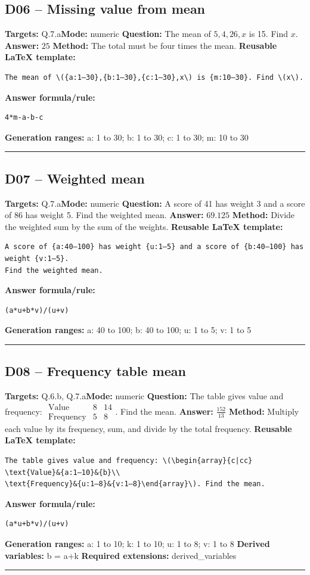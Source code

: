 \documentclass[11pt]{article}
\begin{document}
\subsection{D06 -- Missing value from mean}
\textbf{Targets:} Q.7.a\quad\textbf{Mode:} numeric
\textbf{Question:} The mean of \(5,4,26,x\) is 15. Find \(x\).
\textbf{Answer:} \(25\)
\textbf{Method:} The total must be four times the mean.
\textbf{Reusable LaTeX template:}
\begin{verbatim}
The mean of \({a:1–30},{b:1–30},{c:1–30},x\) is {m:10–30}. Find \(x\).
\end{verbatim}
\textbf{Answer formula/rule:}
\begin{verbatim}
4*m-a-b-c
\end{verbatim}
\textbf{Generation ranges:} a: 1 to 30; b: 1 to 30; c: 1 to 30; m: 10 to 30
\medskip\hrule\medskip
\subsection{D07 -- Weighted mean}
\textbf{Targets:} Q.7.a\quad\textbf{Mode:} numeric
\textbf{Question:} A score of 41 has weight 3 and a score of 86 has weight 5. Find the weighted mean.
\textbf{Answer:} \(69.125\)
\textbf{Method:} Divide the weighted sum by the sum of the weights.
\textbf{Reusable LaTeX template:}
\begin{verbatim}
A score of {a:40–100} has weight {u:1–5} and a score of {b:40–100} has weight {v:1–5}.
Find the weighted mean.
\end{verbatim}
\textbf{Answer formula/rule:}
\begin{verbatim}
(a*u+b*v)/(u+v)
\end{verbatim}
\textbf{Generation ranges:} a: 40 to 100; b: 40 to 100; u: 1 to 5; v: 1 to 5
\medskip\hrule\medskip
\subsection{D08 -- Frequency table mean}
\textbf{Targets:} Q.6.b, Q.7.a\quad\textbf{Mode:} numeric
\textbf{Question:} The table gives value and frequency: \(\begin{array}{c|cc} \text{Value}&8&14\\ \text{Frequency}&5&8\end{array}\). Find the mean.
\textbf{Answer:} \(\frac{152}{13}\)
\textbf{Method:} Multiply each value by its frequency, sum, and divide by the total frequency.
\textbf{Reusable LaTeX template:}
\begin{verbatim}
The table gives value and frequency: \(\begin{array}{c|cc} \text{Value}&{a:1–10}&{b}\\
\text{Frequency}&{u:1–8}&{v:1–8}\end{array}\). Find the mean.
\end{verbatim}
\textbf{Answer formula/rule:}
\begin{verbatim}
(a*u+b*v)/(u+v)
\end{verbatim}
\textbf{Generation ranges:} a: 1 to 10; k: 1 to 10; u: 1 to 8; v: 1 to 8
\textbf{Derived variables:} b = a+k
\textbf{Required extensions:} derived\_variables
\medskip\hrule\medskip
\end{document}
